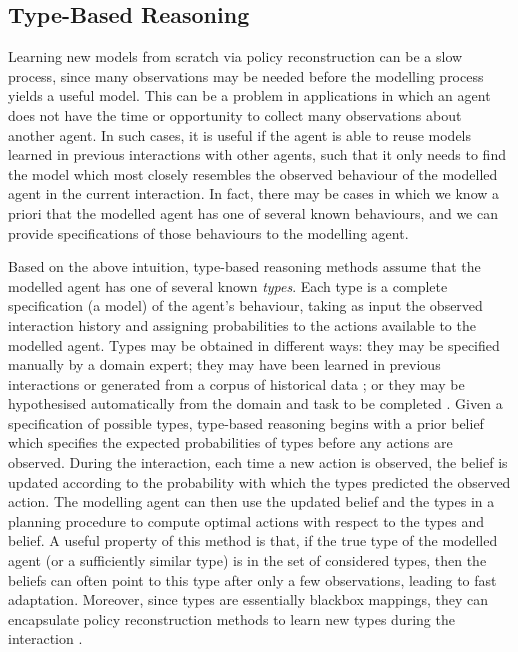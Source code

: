 \documentclass[final,1p,times,authoryear]{elsarticle}
\begin{document}


		\subsection{\bf Type-Based Reasoning} \label{sec:typebased}

Learning new models from scratch via policy reconstruction can be a slow process, since many observations may be needed before the modelling process yields a useful model. This can be a problem in applications in which an agent does not have the time or opportunity to collect many observations about another agent. In such cases, it is useful if the agent is able to reuse models learned in previous interactions with other agents, such that it only needs to find the model which most closely resembles the observed behaviour of the modelled agent in the current interaction. In fact, there may be cases in which we know a priori that the modelled agent has one of several known behaviours, and we can provide specifications of those behaviours to the modelling agent.

Based on the above intuition, type-based reasoning methods assume that the modelled agent has one of several known \emph{types}. Each type is a complete specification (a model) of the agent's behaviour, taking as input the observed interaction history and assigning probabilities to the actions available to the modelled agent. Types may be obtained in different ways: they may be specified manually by a domain expert; they may have been learned in previous interactions or generated from a corpus of historical data \citep[e.g.][]{bskr2013}; or they may be hypothesised automatically from the domain and task to be completed \citep[e.g.][]{acr2015}. Given a specification of possible types, type-based reasoning begins with a prior belief which specifies the expected probabilities of types before any actions are observed. During the interaction, each time a new action is observed, the belief is updated according to the probability with which the types predicted the observed action. The modelling agent can then use the updated belief and the types in a planning procedure to compute optimal actions with respect to the types and belief. A useful property of this method is that, if the true type of the modelled agent (or a sufficiently similar type) is in the set of considered types, then the beliefs can often point to this type after only a few observations, leading to fast adaptation. Moreover, since types are essentially blackbox mappings, they can encapsulate policy reconstruction methods to learn new types during the interaction \citep{ar2013,bsk2011}.
\end{document}
